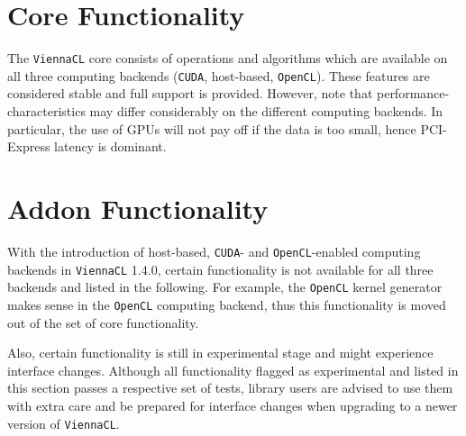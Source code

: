 \documentclass[11pt]{report}
\newcommand{\OpenCL} {\texttt{OpenCL}}
\newcommand{\CUDA} {\texttt{CUDA}}
\newcommand{\ViennaCL} {\texttt{ViennaCL}}
\begin{document}




\clearpage

\tableofcontents

\clearpage
{}




\part{Core Functionality}
The {\ViennaCL} core consists of operations and algorithms which are available on all three computing backends ({\CUDA}, host-based, {\OpenCL}).
These features are considered stable and full support is provided. However, note that performance-characteristics may differ considerably on the different computing backends.
In particular, the use of GPUs will not pay off if the data is too small, hence PCI-Express latency is dominant.












\part{Addon Functionality}
With the introduction of host-based, {\CUDA}- and {\OpenCL}-enabled computing backends in {\ViennaCL} 1.4.0, certain functionality is not available for all three backends and listed in the following.
For example, the {\OpenCL} kernel generator makes sense in the {\OpenCL} computing backend, thus this functionality is moved out of the set of core functionality.

Also, certain functionality is still in experimental stage and might experience interface changes.
Although all functionality flagged as experimental and listed in this section passes a respective set of tests,
library users are advised to use them with extra care and be prepared for interface changes when upgrading to a newer version of {\ViennaCL}.





%
%

\end{document}
